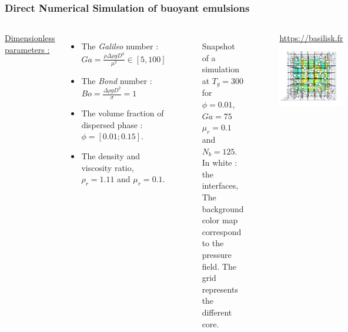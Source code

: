 \documentclass{sintefbeamer}
\begin{document}
\begin{frame}
  \frametitle{Direct Numerical Simulation of buoyant emulsions}
  \begin{columns}
  \underline{Dimensionless parameters :} 
  \begin{itemize}
    \item The \textit{Galileo} number : $Ga =\frac{\rho \Delta\rho gD^3}{\mu^2} \in [5, 100]$
    \item The \textit{Bond} number : $Bo = \frac{\Delta \rho g D^2}{\sigma} = 1$ 
    \item The volume fraction of dispersed phase : $\phi = [0.01;0.15]$. 
    \item The density and viscosity ratio, $\rho_r=1.11$ and $\mu_r= 0.1$. 
  \end{itemize}
  
  \begin{figure}
    \caption{Snapshot of a simulation at $T_g = 300$ for $\phi = 0.01$, $Ga = 75$ $\mu_r = 0.1$ and $N_b = 125$. In white : the interfaces, The background color map correspond to the pressure field. The grid represents the different core.
    }
    \href{file:///work/fintzin/BUBLLES_PROJECT/movies/P_PHI_1_Ga_75.gif}{}
  \end{figure}
  \centering
  \url{https://basilisk.fr}
  \includegraphics[width =  1.1\textwidth]{image/PHI_01_Ga_75.png}
  \end{columns}
\end{frame}
\end{document}
